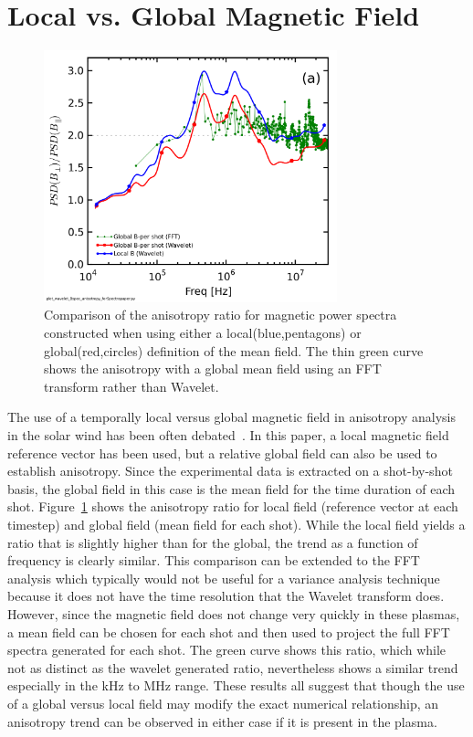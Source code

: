 \documentclass[aip,prl,amsmath,amssymb,reprint,superscriptaddress]{revtex4-1} %
\begin{document}
\section{Local vs. Global Magnetic Field}\label{sec:LocGlobe}

\begin{figure}[!htbp]
\centerline{
\includegraphics[width=8.5cm]{BperpparaGlobalBcomp_chan1t4_1mWbspectra}}
\caption{\label{fig:globalcomparison} Comparison of the anisotropy ratio for magnetic power spectra constructed when using either a local(blue,pentagons) or global(red,circles) definition of the mean field. The thin green curve shows the anisotropy with a global mean field using an FFT transform rather than Wavelet.}
\end{figure}

The use of a temporally local versus global magnetic field in anisotropy analysis in the solar wind has been often debated~\cite{podesta09,matthaeus12}. In this paper, a local magnetic field reference vector has been used, but a relative global field can also be used to establish anisotropy. Since the experimental data is extracted on a shot-by-shot basis, the global field in this case is the mean field for the time duration of each shot. Figure~\ref{fig:globalcomparison} shows the anisotropy ratio for local field (reference vector at each timestep) and global field (mean field for each shot). While the local field yields a ratio that is slightly higher than for the global, the trend as a function of frequency is clearly similar. This comparison can be extended to the FFT analysis which typically would not be useful for a variance analysis technique because it does not have the time resolution that the Wavelet transform does. However, since the magnetic field does not change very quickly in these plasmas, a mean field can be chosen for each shot and then used to project the full FFT spectra generated for each shot. The green curve shows this ratio, which while not as distinct as the wavelet generated ratio, nevertheless shows a similar trend especially in the kHz to MHz range. These results all suggest that though the use of a global versus local field may modify the exact numerical relationship, an anisotropy trend can be observed in either case if it is present in the plasma.
\end{document}
